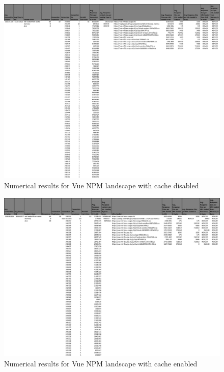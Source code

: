 \begin{figure}[!h]
	\centering
	\begin{adjustbox}{width=\textwidth,totalheight=0.8\textheight}
		\includegraphics[angle=90]{Figures/vue_npm_allhar.pdf}
	\end{adjustbox}
	\caption{Numerical results for Vue NPM landscape with cache disabled}
	\label{fig:appendix_1_11}
\end{figure}
\newpage
\begin{figure}[!h]
	\centering
	\begin{adjustbox}{width=\textwidth,totalheight=0.95\textheight}
		\includegraphics[angle=90]{Figures/vue_npm_allhar_cache.pdf}
	\end{adjustbox}
	\caption{Numerical results for Vue NPM landscape with cache enabled}
	\label{fig:appendix_1_12}
\end{figure}
